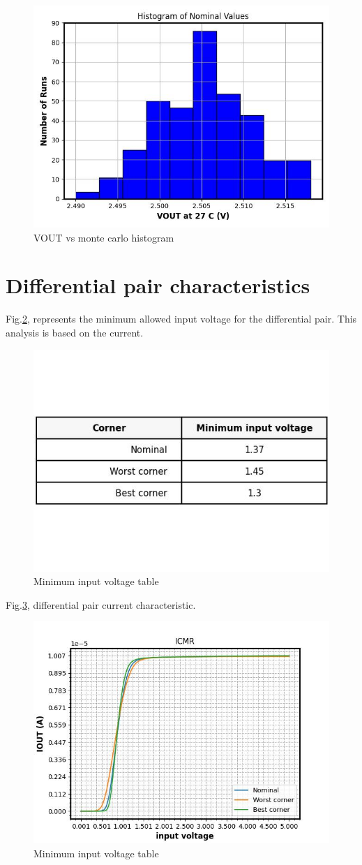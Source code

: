 \documentclass{article}
\begin{document}
\begin{figure}[H] %
    \centering
    \includegraphics[width=.6\textwidth]{./VOUT_value_runs_histogram.jpg} %
    \caption{VOUT vs monte carlo histogram}\label{fig:vout_temp_var_hist}
\end{figure}





\section{Differential pair characteristics}

Fig.\ref{fig:_input_table}, represents the minimum allowed input voltage for the differential pair.  This analysis is based on the current.

\begin{figure}[H] %
    \centering
    \includegraphics[width=.6\textwidth]{./Minimum_input_voltage_table.jpg} %
    \caption{Minimum input voltage table}\label{fig:_input_table}
\end{figure}



Fig.\ref{fig:_input_pair}, differential pair current characteristic.

\begin{figure}[H] %
    \centering
    \includegraphics[width=.6\textwidth]{./Minimum_input_voltage.jpg} %
    \caption{Minimum input voltage table}\label{fig:_input_pair}
\end{figure}
\end{document}
